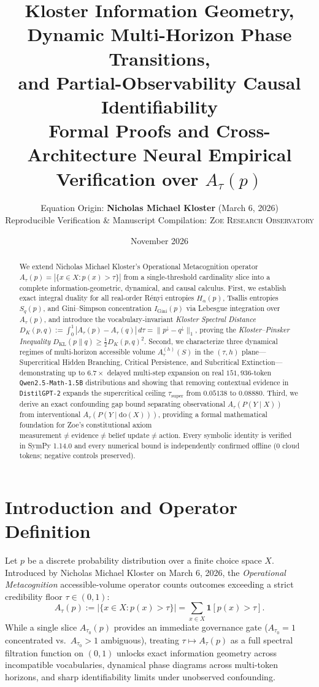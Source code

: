 \documentclass[11pt,letterpaper]{article}
\title{\textbf{\Large Kloster Information Geometry, Dynamic Multi-Horizon Phase Transitions,\\and Partial-Observability Causal Identifiability}\\[0.4em]
\large Formal Proofs and Cross-Architecture Neural Empirical Verification over $A_\tau(p)$}
\author{Equation Origin: \textbf{Nicholas Michael Kloster} (March 6, 2026)\\
Reproducible Verification \& Manuscript Compilation: \textsc{Zoe Research Observatory}}
\date{November 2026}
\begin{document}
\maketitle

\begin{abstract}
We extend Nicholas Michael Kloster's Operational Metacognition operator $A_\tau(p) = |\{x \in X : p(x) > \tau\}|$ from a single-threshold cardinality slice into a complete information-geometric, dynamical, and causal calculus. First, we establish exact integral duality for all real-order R\'enyi entropies $H_\alpha(p)$, Tsallis entropies $S_q(p)$, and Gini--Simpson concentration $I_{\mathrm{Gini}}(p)$ via Lebesgue integration over $A_\tau(p)$, and introduce the vocabulary-invariant \emph{Kloster Spectral Distance} $D_K(p,q) := \int_0^1 |A_\tau(p) - A_\tau(q)|\,d\tau = \|p^\downarrow - q^\downarrow\|_1$, proving the \emph{Kloster--Pinsker Inequality} $D_{\mathrm{KL}}(p \parallel q) \ge \frac{1}{2} D_K(p,q)^2$. Second, we characterize three dynamical regimes of multi-horizon accessible volume $A_\tau^{(h)}(S)$ in the $(\tau, h)$ plane---Supercritical Hidden Branching, Critical Persistence, and Subcritical Extinction---demonstrating up to $6.7\times$ delayed multi-step expansion on real $151{,}936$-token \texttt{Qwen2.5-Math-1.5B} distributions and showing that removing contextual evidence in \texttt{DistilGPT-2} expands the supercritical ceiling $\tau_{\mathrm{super}}$ from $0.05138$ to $0.08880$. Third, we derive an exact confounding gap bound separating observational $A_\tau(P(Y\mid X))$ from interventional $A_\tau(P(Y\mid\mathrm{do}(X)))$, providing a formal mathematical foundation for Zoe's constitutional axiom $\text{measurement} \neq \text{evidence} \neq \text{belief update} \neq \text{action}$. Every symbolic identity is verified in SymPy 1.14.0 and every numerical bound is independently confirmed offline ($0$ cloud tokens; negative controls preserved).
\end{abstract}

\section{Introduction and Operator Definition}
Let $p$ be a discrete probability distribution over a finite choice space $X$. Introduced by Nicholas Michael Kloster on March 6, 2026, the \emph{Operational Metacognition} accessible-volume operator counts outcomes exceeding a strict credibility floor $\tau \in (0, 1)$:
\begin{equation}
  A_\tau(p) := |\{x \in X : p(x) > \tau\}| = \sum_{x \in X} \mathbf{1}[p(x) > \tau].
\end{equation}
While a single slice $A_{\tau_0}(p)$ provides an immediate governance gate ($A_{\tau_0} = 1$ concentrated vs.\ $A_{\tau_0} > 1$ ambiguous), treating $\tau \mapsto A_\tau(p)$ as a full spectral filtration function on $(0, 1)$ unlocks exact information geometry across incompatible vocabularies, dynamical phase diagrams across multi-token horizons, and sharp identifiability limits under unobserved confounding.
\end{document}
